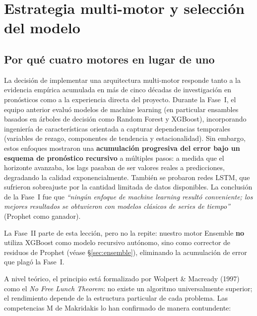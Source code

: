 \documentclass[12pt, letterpaper]{article}
\begin{document}
\newpage
\section{Estrategia multi-motor y selección del modelo}\label{sec:modelos}

\subsection{Por qué cuatro motores en lugar de uno}

La decisión de implementar una arquitectura multi-motor responde tanto a la evidencia empírica acumulada en más de cinco décadas de investigación en pronósticos como a la experiencia directa del proyecto. Durante la Fase~I, el equipo anterior evaluó modelos de machine learning (en particular ensambles basados en árboles de decisión como Random Forest y XGBoost), incorporando ingeniería de características orientada a capturar dependencias temporales (variables de rezago, componentes de tendencia y estacionalidad). Sin embargo, estos enfoques mostraron una \textbf{acumulación progresiva del error bajo un esquema de pronóstico recursivo} a múltiples pasos: a medida que el horizonte avanzaba, los lags pasaban de ser valores reales a predicciones, degradando la calidad exponencialmente. También se probaron redes LSTM, que sufrieron sobreajuste por la cantidad limitada de datos disponibles. La conclusión de la Fase~I fue que \textit{``ningún enfoque de machine learning resultó conveniente; los mejores resultados se obtuvieron con modelos clásicos de series de tiempo''} (Prophet como ganador).

La Fase~II parte de esta lección, pero no la repite: nuestro motor Ensemble \textbf{no} utiliza XGBoost como modelo recursivo autónomo, sino como corrector de residuos de Prophet (véase \S\ref{sec:ensemble}), eliminando la acumulación de error que plagó la Fase~I.

A nivel teórico, el principio está formalizado por Wolpert \& Macready (1997) como el \textit{No Free Lunch Theorem}: no existe un algoritmo universalmente superior; el rendimiento depende de la estructura particular de cada problema. Las competencias M de Makridakis lo han confirmado de manera contundente:
\end{document}
